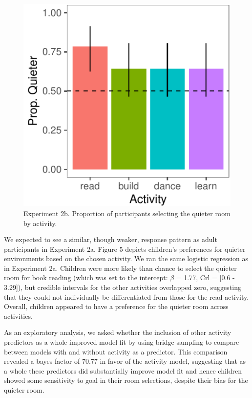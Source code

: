 \documentclass[10pt, letterpaper]{article}
\newenvironment{CodeChunk}{}{}
\begin{document}
\begin{CodeChunk}
\begin{figure}[t]

{\centering \includegraphics{figs/2b-bar-1} 

}

\caption[Experiment 2b]{Experiment 2b. Proportion of participants selecting the quieter room by activity.}\label{fig:2b-bar}
\end{figure}
\end{CodeChunk}

We expected to see a similar, though weaker, response pattern as adult
participants in Experiment 2a. Figure 5 depicts children's preferences
for quieter environments based on the chosen activity. We ran the same
logistic regression as in Experiment 2a. Children were more likely than
chance to select the quieter room for book reading (which was set to the
intercept: \(\beta\) = 1.77, Crl = {[}0.6 - 3.29{]}), but credible
intervals for the other activities overlapped zero, suggesting that they
could not individually be differentiated from those for the read
activity. Overall, children appeared to have a preference for the
quieter room across activities.

As an exploratory analysis, we asked whether the inclusion of other
activity predictors as a whole improved model fit by using bridge
sampling to compare between models with and without activity as a
predictor. This comparison revealed a bayes factor of 70.77 in favor of
the activity model, suggesting that as a whole these predictors did
substantially improve model fit and hence children showed some
sensitivity to goal in their room selections, despite their bias for the
quieter room.
\end{document}
